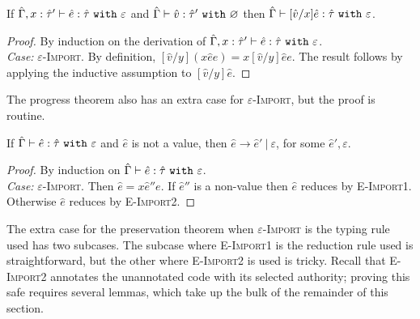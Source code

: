 \begin{lemma}[Substitution]
If $\hat \Gamma, x: \hat \tau' \vdash \hat e: \hat \tau~\mathtt{with}~ \varepsilon$ and $\hat \Gamma \vdash \hat v: \hat \tau'~\mathtt{with}~ \varnothing$ then $\hat \Gamma \vdash [\hat v/x]\hat e: \hat \tau~\mathtt{with}~ \varepsilon$.
\end{lemma}

\begin{proof} By induction on the derivation of $\hat \Gamma, x: \hat \tau' \vdash \hat e: \hat \tau~\mathtt{with}~ \varepsilon$.\\

\textit{Case:} \textsc{$\varepsilon$-Import}. By definition, $[\hat v/y]({x}{\hat e}{e}) = {x}{[\hat v/y] \hat e}{e}$. The result follows by applying the inductive assumption to $[\hat v/y] \hat e$.
\end{proof}

The progress theorem also has an extra case for \textsc{$\varepsilon$-Import}, but the proof is routine.

\begin{theorem}[Progress]
If $\hat \Gamma \vdash \hat e: \hat \tau~\mathtt{with}~ \varepsilon$ and $\hat e$ is not a value, then $\hat e \longrightarrow \hat e'~|~\varepsilon$, for some $\hat e', \varepsilon$.
\end{theorem}

\begin{proof} By induction on $\hat \Gamma \vdash \hat e: \hat \tau~\mathtt{with}~ \varepsilon$.\\

\textit{Case:} \textsc{$\varepsilon$-Import}. Then $\hat e = {x}{\hat e''}{e}$. If $\hat e''$ is a non-value then $\hat e$ reduces by \textsc{E-Import1}. Otherwise $\hat e$ reduces by \textsc{E-Import2}.
\end{proof}

The extra case for the preservation theorem when \textsc{$\varepsilon$-Import} is the typing rule used has two subcases. The subcase where \textsc{E-Import1} is the reduction rule used is straightforward, but the other where \textsc{E-Import2} is used is tricky. Recall that \textsc{E-Import2} annotates the unannotated code with its selected authority; proving this safe requires several lemmas, which take up the bulk of the remainder of this section.

